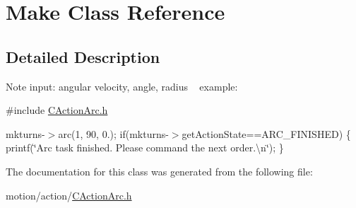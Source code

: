 \hypertarget{classMake}{}\section{Make Class Reference}
\label{classMake}


\subsection{Detailed Description}
\begin{DoxyNote}{Note}
input\+: angular velocity, angle, radius ~\newline
example\+:
\end{DoxyNote}
\#include \mbox{\hyperlink{CActionArc_8h}{C\+Action\+Arc.\+h}}

mkturns-\/$>$arc(1, 90, 0.); if(mkturns-\/$>$get\+Action\+State==A\+R\+C\+\_\+\+F\+I\+N\+I\+S\+H\+ED) \{ printf(\char`\"{}\+Arc task finished. Please command the next order.\textbackslash{}n\char`\"{}); \} 

The documentation for this class was generated from the following file\+:\begin{DoxyCompactItemize}
\item 
motion/action/\mbox{\hyperlink{CActionArc_8h}{C\+Action\+Arc.\+h}}\end{DoxyCompactItemize}
